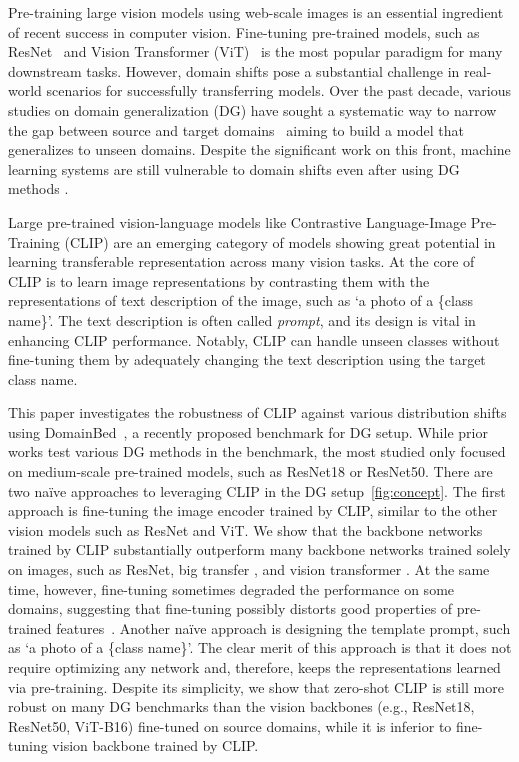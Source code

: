 \documentclass[letterpaper]{article} \usepackage[]{aaai23}
\begin{document}
Pre-training large vision models using web-scale images is an essential ingredient of recent success in computer vision. 
Fine-tuning pre-trained models, such as ResNet~\cite{he2015deep} and Vision Transformer (ViT)~\cite{dosovitskiy2020image} is the most popular paradigm for many downstream tasks. 
However, domain shifts pose a substantial challenge in real-world scenarios for successfully transferring models. 
Over the past decade, various studies on domain generalization (DG) have sought a systematic way to narrow the gap between source and target domains~\cite{zhou2021domain,wang2021generalizing,shen2021towards} aiming to build a model that generalizes to unseen domains. 
Despite the significant work on this front, machine learning systems are still vulnerable to domain shifts even after using DG methods \cite{gulrajani2020search}. 

Large pre-trained vision-language models like Contrastive Language-Image Pre-Training (CLIP) are an emerging category of models showing great potential in learning transferable representation across many vision tasks. 
At the core of CLIP is to learn image representations by contrasting them with the representations of text description of the image, such as `a photo of a \{class name\}'. 
The text description is often called \textit{prompt}, and its design is vital in enhancing CLIP performance. 
Notably, CLIP can handle unseen classes without fine-tuning them by adequately changing the text description using the target class name. 

This paper investigates the robustness of CLIP against various distribution shifts using DomainBed~\cite{gulrajani2020search}, a recently proposed benchmark for DG setup. 
While prior works test various DG methods in the benchmark, the most studied only focused on medium-scale pre-trained models, such as ResNet18 or ResNet50. 
There are two na\"{i}ve approaches to leveraging CLIP in the DG setup~\autoref{fig:concept}. 
The first approach is fine-tuning the image encoder trained by CLIP, similar to the other vision models such as ResNet and ViT. 
We show that the backbone networks trained by CLIP substantially outperform many backbone networks trained solely on images, such as ResNet, big transfer \cite{kolesnikov2020big}, and vision transformer \cite{dosovitskiy2020image}. 
At the same time, however, fine-tuning sometimes degraded the performance on some domains, suggesting that fine-tuning possibly distorts good properties of pre-trained features~\cite{kumar2022fine}. 
Another na\"{i}ve approach is designing the template prompt, such as `a photo of a \{class name\}'. 
The clear merit of this approach is that it does not require optimizing any network and, therefore, keeps the representations learned via pre-training.
Despite its simplicity, we show that zero-shot CLIP is still more robust on many DG benchmarks than the vision backbones (e.g., ResNet18, ResNet50, ViT-B16) fine-tuned on source domains, while it is inferior to fine-tuning vision backbone trained by CLIP.
\end{document}

